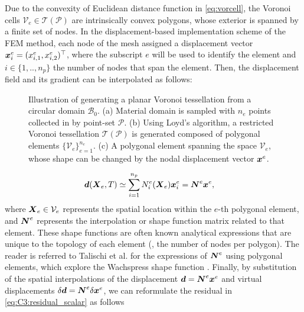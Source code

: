 Due to the convexity of Euclidean distance function in \eqref{eq:vorcell}, the Voronoi cells $\mathcal{V}_e \in \mathcal{T}(\mathcal{P})$ are intrinsically convex polygons, whose exterior is spanned by a finite set of nodes. In the displacement-based implementation scheme of the FEM method, each node of the mesh assigned a displacement vector ${\boldsymbol{x}}^e_i = (x^e_{i,1}, x^e_{i,2})^\top$, where the subscript $e$ will be used to identify the element and $i \in \{1,..,n_p\}$ the number of nodes that span the element. Then, the displacement field and its gradient can be interpolated as follows:
%
\begin{figure}
\centering
\vspace{-2mm}

\caption{Illustration of generating a planar Voronoi tessellation from a circular domain $\mathcal{B}_0$. (a) Material domain is sampled with $n_e$ points collected in by point-set $\mathcal{P}$. (b) Using Loyd's algorithm, a restricted Voronoi tessellation $\mathcal{T}(\mathcal{P})$ is generated composed of polygonal elements $\{\mathcal{V}_e\}_{e=1}^{n_e}$. (c) A polygonal element spanning the space $\mathcal{V}_e$, whose shape can be changed by the nodal displacement vector ${\boldsymbol{x}}^{e}$. \label{fig:C3:voronoimeshExample}}
\end{figure}
%
\begin{align}
\dB(\XB_e,T) &\simeq \sum^{n_p}_{i=1} N_i^e(\XB_e) \xB^{e}_i  = \NB^{e} \xB^{e},%
\end{align}
%
where ${\boldsymbol{X}}_e \in \mathcal{V}_e$ represents the spatial location within the $e$-th polygonal element, and ${\boldsymbol{N}}^{e}$ represents the interpolation or shape function matrix related to that element. These shape functions are often known analytical expressions that are unique to the topology of each element (\ie, the number of nodes per polygon). The reader is referred to Talischi et al. \cite{Talischi2012,Talischi2012Mar} for the expressions of ${\boldsymbol{N}}^{e}$ using polygonal elements, which explore the Wachspress shape function \cite{Wachspress1975}.
Finally, by substitution of the spatial interpolations of the displacement ${\boldsymbol{d}} = {\boldsymbol{N}}^e {\boldsymbol{x}}^e$ and virtual displacements $\delta {\boldsymbol{d}} = {\boldsymbol{N}}^e\delta {\boldsymbol{x}}^e$, we can reformulate the residual in \eqref{eq:C3:residual_scalar} as follows
